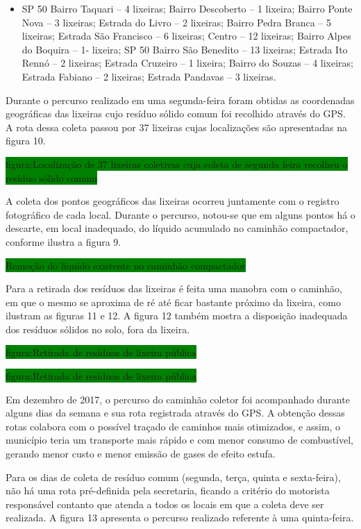 	\begin{itemize}
		\item SP 50 Bairro Taquari – 4 lixeiras; 
		Bairro Descoberto – 1 lixeira; 
		Bairro Ponte Nova – 3 lixeiras; 
		Estrada do Livro – 2 lixeiras; 
		Bairro Pedra Branca – 5 lixeiras; 
		Estrada São Francisco – 6 lixeiras; 
		Centro – 12 lixeiras; 
		Bairro Alpes do Boquira – 1- lixeira; 
		SP 50 Bairro São Benedito – 13 lixeiras; 
		Estrada Ito Rennó – 2 lixeiras; 
		Estrada Cruzeiro – 1 lixeira; 
		Bairro do Souzas – 4 lixeiras; 
		Estrada Fabiano – 2 lixeiras; 
		Estrada Pandavas – 3 lixeiras.
	\end{itemize}

	Durante o percurso realizado em uma segunda-feira foram obtidas as coordenadas geográficas das lixeiras cujo resíduo sólido comum foi recolhido através do GPS. A rota dessa coleta passou por 37 lixeiras cujas localizações são apresentadas na figura 10. 
	
	\colorbox{green}{figura:Localização de 37 lixeiras coletivas cuja coleta de segunda feira recolheu o resíduo sólido comum}
	
	A coleta dos pontos geográficos das lixeiras ocorreu juntamente com o registro fotográfico de cada local.  Durante o percurso, notou-se que em alguns pontos há o descarte, em local inadequado, do líquido acumulado no caminhão compactador, conforme ilustra a figura 9.
	
	\colorbox{green}{Remoção do liquido existente no caminhão compactador}
	
	Para a retirada dos resíduos das lixeiras é feita uma manobra com o caminhão, em que o mesmo se aproxima de ré até ficar bastante próximo da lixeira, como ilustram as figuras 11 e 12. A figura 12 também mostra a disposição inadequada dos resíduos sólidos no solo, fora da lixeira.
	
	\colorbox{green}{figura:Retirada de resíduos de lixeira pública}
	
	\colorbox{green}{figura:Retirada de resíduos de lixeira pública}
	
	Em dezembro de 2017, o percurso do caminhão coletor foi acompanhado durante alguns dias da semana e sua rota registrada através do GPS. A obtenção dessas rotas colabora com o possível traçado de caminhos mais otimizados, e assim, o município teria um transporte mais rápido e com menor consumo de combustível, gerando menor custo e menor emissão de gases de efeito estufa.
	
	Para os dias de coleta de resíduo comum (segunda, terça, quinta e sexta-feira), não há uma rota pré-definida pela secretaria, ficando a critério do motorista responsável contanto que atenda a todos os locais em que a coleta deve ser realizada. A figura 13 apresenta o percurso realizado referente à uma quinta-feira.
	

